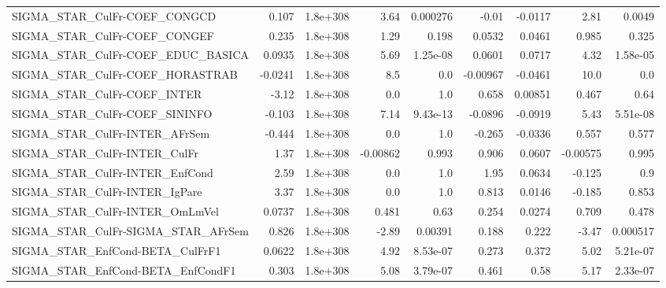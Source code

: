 \begin{tabular}{lrrrrrrrr}
SIGMA\_STAR\_CulFr-COEF\_CONGCD          &       0.107 &     1.8e+308 &     3.64 & 0.000276 &      -0.01 &     -0.0117 &         2.81 &        0.0049 \\
SIGMA\_STAR\_CulFr-COEF\_CONGEF          &       0.235 &     1.8e+308 &     1.29 &    0.198 &     0.0532 &      0.0461 &        0.985 &         0.325 \\
SIGMA\_STAR\_CulFr-COEF\_EDUC\_BASICA     &      0.0935 &     1.8e+308 &     5.69 & 1.25e-08 &     0.0601 &      0.0717 &         4.32 &      1.58e-05 \\
SIGMA\_STAR\_CulFr-COEF\_HORASTRAB       &     -0.0241 &     1.8e+308 &      8.5 &      0.0 &   -0.00967 &     -0.0461 &         10.0 &           0.0 \\
SIGMA\_STAR\_CulFr-COEF\_INTER           &       -3.12 &     1.8e+308 &      0.0 &      1.0 &      0.658 &     0.00851 &        0.467 &          0.64 \\
SIGMA\_STAR\_CulFr-COEF\_SININFO         &      -0.103 &     1.8e+308 &     7.14 & 9.43e-13 &    -0.0896 &     -0.0919 &         5.43 &      5.51e-08 \\
SIGMA\_STAR\_CulFr-INTER\_AFrSem         &      -0.444 &     1.8e+308 &      0.0 &      1.0 &     -0.265 &     -0.0336 &        0.557 &         0.577 \\
SIGMA\_STAR\_CulFr-INTER\_CulFr          &        1.37 &     1.8e+308 & -0.00862 &    0.993 &      0.906 &      0.0607 &     -0.00575 &         0.995 \\
SIGMA\_STAR\_CulFr-INTER\_EnfCond        &        2.59 &     1.8e+308 &      0.0 &      1.0 &       1.95 &      0.0634 &       -0.125 &           0.9 \\
SIGMA\_STAR\_CulFr-INTER\_IgPare         &        3.37 &     1.8e+308 &      0.0 &      1.0 &      0.813 &      0.0146 &       -0.185 &         0.853 \\
SIGMA\_STAR\_CulFr-INTER\_OmLmVel        &      0.0737 &     1.8e+308 &    0.481 &     0.63 &      0.254 &      0.0274 &        0.709 &         0.478 \\
SIGMA\_STAR\_CulFr-SIGMA\_STAR\_AFrSem    &       0.826 &     1.8e+308 &    -2.89 &  0.00391 &      0.188 &       0.222 &        -3.47 &      0.000517 \\
SIGMA\_STAR\_EnfCond-BETA\_CulFrF1       &      0.0622 &     1.8e+308 &     4.92 & 8.53e-07 &      0.273 &       0.372 &         5.02 &      5.21e-07 \\
SIGMA\_STAR\_EnfCond-BETA\_EnfCondF1     &       0.303 &     1.8e+308 &     5.08 & 3.79e-07 &      0.461 &        0.58 &         5.17 &      2.33e-07 \\

\end{tabular}
